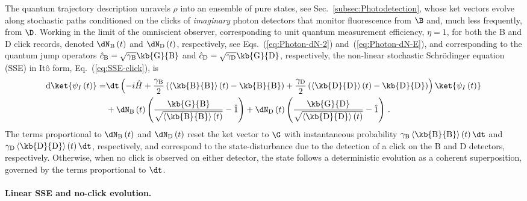 The quantum trajectory description \citep{Carmichael1993,Dalibard1992-original-traj,Dum1992}
unravels $\rho$ into an ensemble of pure states, see Sec.~\ref{subsec:Photodetection},
whose ket vectors evolve along stochastic paths conditioned on the
clicks of \emph{imaginary} photon detectors that monitor fluorescence
from $\B$ and, much less frequently, from $\D$. Working in the limit
of the omniscient observer,  corresponding to unit quantum measurement
efficiency, $\eta=1$, for both the B and D click records, denoted
$\dN_{\mathrm{B}}\left(t\right)$ and $\dN_{\mathrm{D}}\left(t\right)$,
respectively, see Eqs.~(\ref{eq:Photon-dN-2}) and~(\ref{eq:Photon-dN-E}),
and corresponding to the quantum jump operators $\hat{c}_{\mathrm{B}}=\sqrt{\gamma_{{\rm B}}}\kb{\mathrm{G}}{\mathrm{B}}$
and $\hat{c}_{\mathrm{D}}=\sqrt{\gamma_{{\rm D}}}\kb{\mathrm{G}}{\mathrm{D}}$,
respectively, the non-linear stochastic Schrödinger equation (SSE)
in Itô form, Eq.~(\ref{eq:SSE-click}), is
\begin{align}
\mathrm{d}\ket{\psi_{I}\left(t\right)}= & \dt\left(-i\hat{H}+\frac{\gamma_{\mathrm{B}}}{2}\left(\left\langle \kb{\mathrm{B}}{\mathrm{B}}\right\rangle \left(t\right)-\kb{\mathrm{B}}{\mathrm{B}}\right)+\frac{\gamma_{\mathrm{D}}}{2}\left(\left\langle \kb{\mathrm{D}}{\mathrm{D}}\right\rangle \left(t\right)-\kb{\mathrm{D}}{\mathrm{D}}\right)\right)\ket{\psi_{I}\left(t\right)}\nonumber \\
 & +\dN_{\mathrm{B}}\left(t\right)\left(\frac{\kb{\mathrm{G}}{\mathrm{B}}}{\sqrt{\left\langle \kb{\mathrm{B}}{\mathrm{B}}\right\rangle \left(t\right)}}-\hat{1}\right)+\dN_{\mathrm{D}}\left(t\right)\left(\frac{\kb{\mathrm{G}}{\mathrm{D}}}{\sqrt{\left\langle \kb{\mathrm{D}}{\mathrm{D}}\right\rangle \left(t\right)}}-\hat{1}\right)\,.\label{eq:PhotonPsiI}
\end{align}
The terms proportional to $\dN_{\mathrm{B}}\left(t\right)$ and $\dN_{\mathrm{D}}\left(t\right)$
reset the ket vector to $\G$ with instantaneous probability $\gamma_{\mathrm{B}}\left\langle \kb{\mathrm{B}}{\mathrm{B}}\right\rangle \left(t\right)\dt$
and $\gamma_{\mathrm{D}}\left\langle \kb{\mathrm{D}}{\mathrm{D}}\right\rangle \left(t\right)\dt$,
respectively, and correspond to the state-disturbance due to the detection
of a click on the B and D detectors, respectively. Otherwise, when
no click is observed on either detector, the state follows a deterministic
evolution as a coherent superposition, governed by the terms proportional
to $\dt$. 

\paragraph{Linear SSE and no-click evolution. }

